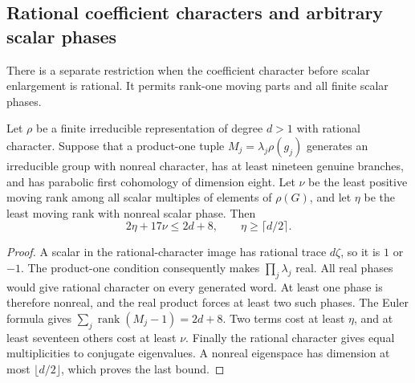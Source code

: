 \subsection{Rational coefficient characters and arbitrary scalar phases}

There is a separate restriction when the coefficient character before
scalar enlargement is rational.  It permits rank-one moving parts and
all finite scalar phases.

\begin{lemma}\label{lem:rational-scalar-budget}
Let $\rho$ be a finite irreducible representation of degree $d>1$
with rational character.  Suppose that a product-one tuple
$M_j=\lambda_j\rho(g_j)$ generates an irreducible group with nonreal
character, has at least nineteen genuine branches, and has parabolic
first cohomology of dimension eight.  Let $\nu$ be the least positive
moving rank among all scalar multiples of elements of $\rho(G)$,
and let $\eta$ be the least moving rank with nonreal scalar phase.
Then
\[
 2\eta+17\nu\le 2d+8,\qquad \eta\ge\lceil d/2\rceil.
\]
\end{lemma}
\begin{proof}
A scalar in the rational-character image has rational trace $d\zeta$,
so it is $1$ or $-1$.  The product-one condition consequently makes
$\prod_j\lambda_j$ real.  All real phases would give rational
character on every generated word.  At least one phase is therefore
nonreal, and the real product forces at least two such phases.
The Euler formula gives $\sum_j\operatorname{rank}(M_j-1)=2d+8$.
Two terms cost at least $\eta$, and at least seventeen others cost
at least $\nu$.  Finally the rational character gives equal
multiplicities to conjugate eigenvalues.  A nonreal eigenspace has
dimension at most $\lfloor d/2\rfloor$, which proves the last bound.
\end{proof}

